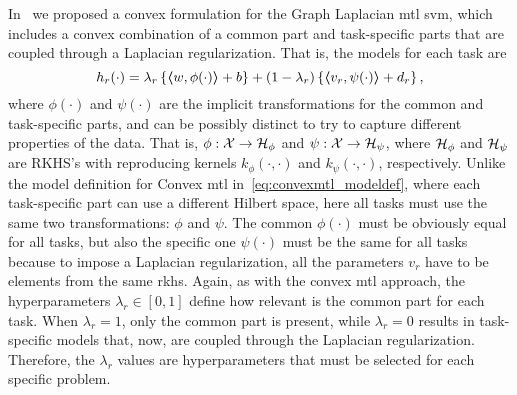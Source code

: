 In~\cite{RuizAD20} we proposed a convex formulation for the Graph Laplacian \acrshort{mtl} \acrshort{svm}, which includes a convex combination of a common part and task-specific parts that are coupled through a Laplacian regularization.
That is, the models for each task are
\begin{equation}
    \nonumber
    h_r({\cdot}) = \lambda_r \left\lbrace \bm{\left\langle} w, \phi(\cdot) \bm{\right\rangle} + b  \right\rbrace + (1 - \lambda_r) \left\lbrace \bm{\left\langle} {v}_r, \psi(\cdot) \bm{\right\rangle} + d_r \right\rbrace ,
\end{equation}
where $\phi(\cdot)$ and $\psi(\cdot)$ are the implicit transformations for the common and task-specific parts, and can be possibly distinct to try to capture different properties of the data.
That is, $\phi: \mathcal{X} \to \mathcal{H}_\phi$ and $\psi: \mathcal{X} \to \mathcal{H}_\psi$, where $\mathcal{H}_\phi$ and $\mathcal{H}_\psi$ are RKHS's with reproducing kernels $k_\phi(\cdot, \cdot)$ and $k_\psi(\cdot, \cdot)$, respectively.
Unlike the model definition for Convex \acrshort{mtl} in~\eqref{eq:convexmtl_modeldef}, where each task-specific part can use a different Hilbert space, here all tasks must use the same two transformations: $\phi$ and $\psi$. The common $\phi(\cdot)$ must be obviously equal for all tasks, but also the specific one $\psi(\cdot)$ must be the same for all tasks because to impose a Laplacian regularization, all the parameters $v_r$ have to be elements from the same \acrshort{rkhs}.
Again, as with the convex \acrshort{mtl} approach, the hyperparameters $\lambda_r \in [0, 1]$ define how relevant is the common part for each task. When $\lambda_r=1$, only the common part is present, while $\lambda_r=0$ results in task-specific models that, now, are coupled through the Laplacian regularization.
%
Therefore, the $\lambda_r$ values are hyperparameters that must be selected for each specific problem.

